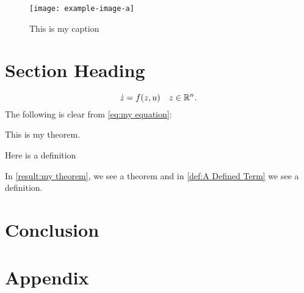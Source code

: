 \begin{figure}[htbp]
    \centering
    \texttt{[image: example-image-a]}
    \caption{This is my caption}
    \label{fig:this is a figure}
\end{figure}

\lipsum[7]

\section{Section Heading}

\lipsum[9]
\begin{equation}
    \label{eq:my equation}
    \dot z = f(z,u) \quad z \in \mathbb{R}^n.
\end{equation}
The following is clear from \cref{eq:my equation}:
\lipsum[10-11]

\begin{theorem}
    \label{result:my theorem}
    This is my theorem.
\end{theorem}
\begin{definition}[My Definition]
    \label{def:A Defined Term}
    Here is a definition
\end{definition}
In \cref{result:my theorem}, we see a theorem and in \cref{def:A Defined Term} we see a definition. 


\section{Conclusion}
\label{sec:conclusion}
\lipsum[12]


\nocite{goebel_hybrid_2012}

\makeatletter%
\makeatother%

\appendix
\section{Appendix}
\label{sec:appendix}

\lipsum[1]
